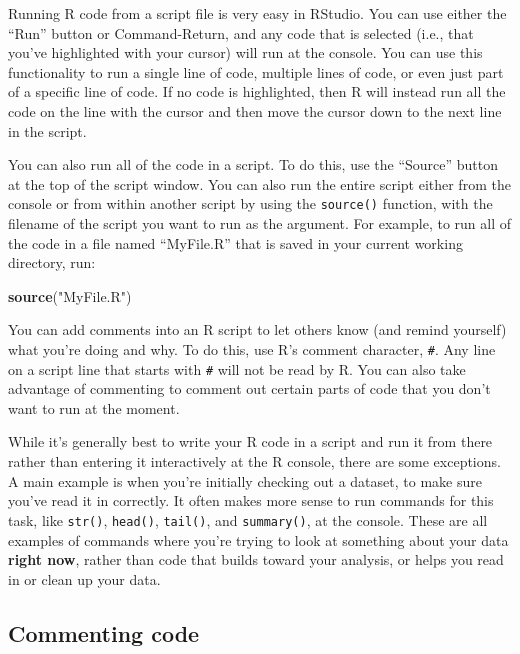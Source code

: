 \documentclass[]{book}
\makeatletter
\newenvironment{Shaded}{\begin{snugshade}}{\end{snugshade}}
\newcommand{\KeywordTok}[1]{\textcolor[rgb]{0.13,0.29,0.53}{\textbf{#1}}}
\newcommand{\StringTok}[1]{\textcolor[rgb]{0.31,0.60,0.02}{#1}}
\newcommand{\NormalTok}[1]{#1}
\newenvironment{kframe}{%
\medskip{}
\setlength{\fboxsep}{.8em}
 \def\at@end@of@kframe{}%
 \ifinner\ifhmode%
  \def\at@end@of@kframe{\end{minipage}}%
  \begin{minipage}{\columnwidth}%
 \fi\fi%
 \def\FrameCommand##1{\hskip\@totalleftmargin \hskip-\fboxsep
 \colorbox{shadecolor}{##1}\hskip-\fboxsep
     \hskip-\linewidth \hskip-\@totalleftmargin \hskip\columnwidth}%
 \MakeFramed {\advance\hsize-\width
   \@totalleftmargin\z@ \linewidth\hsize
   \@setminipage}}%
 {\par\unskip\endMakeFramed%
 \at@end@of@kframe}
\renewenvironment{Shaded}{\begin{kframe}}{\end{kframe}}
\theoremstyle{definition}
\theoremstyle{definition}
\theoremstyle{definition}
\theoremstyle{remark}
\makeatother
\begin{document}
Running R code from a script file is very easy in RStudio. You can use
either the ``Run'' button or Command-Return, and any code that is
selected (i.e., that you've highlighted with your cursor) will run at
the console. You can use this functionality to run a single line of
code, multiple lines of code, or even just part of a specific line of
code. If no code is highlighted, then R will instead run all the code on
the line with the cursor and then move the cursor down to the next line
in the script.

You can also run all of the code in a script. To do this, use the
``Source'' button at the top of the script window. You can also run the
entire script either from the console or from within another script by
using the \texttt{source()} function, with the filename of the script
you want to run as the argument. For example, to run all of the code in
a file named ``MyFile.R'' that is saved in your current working
directory, run:

\begin{Shaded}
\begin{Highlighting}[]
\KeywordTok{source}\NormalTok{(}\StringTok{"MyFile.R"}\NormalTok{)}
\end{Highlighting}
\end{Shaded}

You can add comments into an R script to let others know (and remind
yourself) what you're doing and why. To do this, use R's comment
character, \texttt{\#}. Any line on a script line that starts with
\texttt{\#} will not be read by R. You can also take advantage of
commenting to comment out certain parts of code that you don't want to
run at the moment.

While it's generally best to write your R code in a script and run it
from there rather than entering it interactively at the R console, there
are some exceptions. A main example is when you're initially checking
out a dataset, to make sure you've read it in correctly. It often makes
more sense to run commands for this task, like \texttt{str()},
\texttt{head()}, \texttt{tail()}, and \texttt{summary()}, at the
console. These are all examples of commands where you're trying to look
at something about your data \textbf{right now}, rather than code that
builds toward your analysis, or helps you read in or clean up your data.

\subsection{Commenting code}\label{commenting-code}
\end{document}
